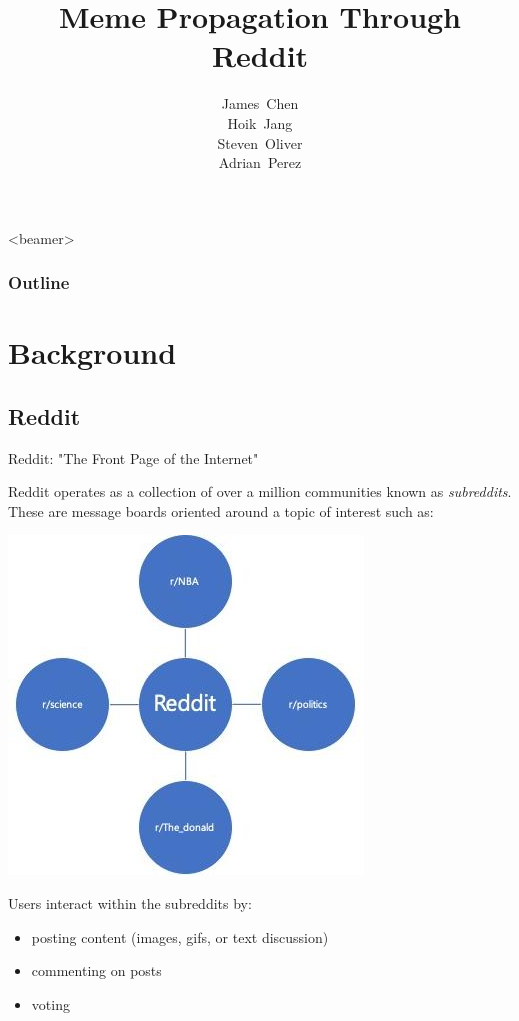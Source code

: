 \documentclass{beamer}
\title[Meme Propagation]{Meme Propagation Through Reddit}
\author[]{James~Chen \\ Hoik~Jang \\ Steven~Oliver \\ Adrian~Perez}
\begin{document}

\begin{frame}
 \titlepage
\end{frame}

\begin{frame}<beamer>
  \frametitle{Outline}
  \tableofcontents
\end{frame}

\section{Background} %

\subsection{Reddit} %

\begin{frame}{Reddit: "The Front Page of the Internet"}

Reddit operates as a collection of over a million communities known as \textit{subreddits}.
These are message boards oriented around a topic of interest such as:
\begin{center}
\includegraphics[scale=0.5]{Plots/redditsub}
\end{center}
Users interact within the subreddits by:
\begin{itemize}
\item posting content (images, gifs, or text discussion)
\item commenting on posts
\item voting
\end{itemize}

\end{frame}
\end{document}
